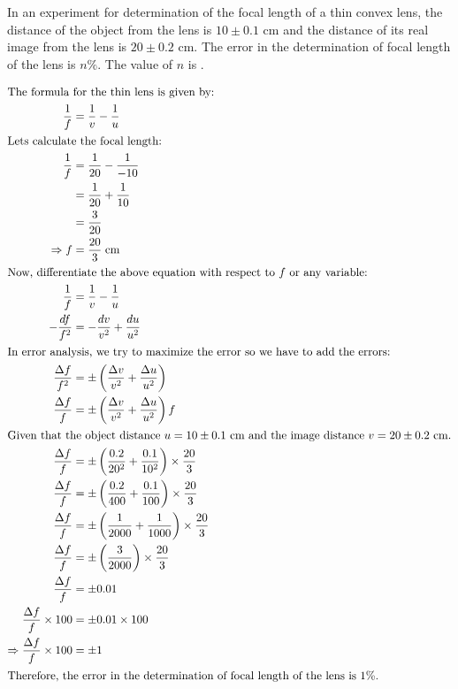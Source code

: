 \item In an experiment for determination of the focal length of a thin convex lens, the distance of the object from the lens is \(10 \pm 0.1\) cm and the distance of its real image from the lens is \(20 \pm 0.2\) cm. The error in the determination of focal length of the lens is \(n \%\). The value of \(n\) is \underline{\hspace{3cm}}. 

\begin{solution}
    \begin{align*}
        \intertext{The formula for the thin lens is given by:}
        \dfrac{1}{f} &= \dfrac{1}{v} - \dfrac{1}{u}\\
        \intertext{Lets calculate the focal length:}
        \dfrac{1}{f} &= \dfrac{1}{20} - \dfrac{1}{-10}\\
        &= \dfrac{1}{20} + \dfrac{1}{10}\\
        &= \dfrac{3}{20}\\
        \Rightarrow f &= \dfrac{20}{3} \; \text{cm}\\
        \intertext{Now, differentiate the above equation with respect to $f$ or any variable:}
        \dfrac{1}{f} &= \dfrac{1}{v} - \dfrac{1}{u}\\
        -\dfrac{df}{f^2} &= -\dfrac{dv}{v^2} + \dfrac{du}{u^2}\\
        \intertext{In error analysis, we try to maximize the error so we have to add the errors:}
        \frac{\Delta f}{f^2} &= \pm \left(\frac{\Delta v}{v^2} + \frac{\Delta u}{u^2}\right)\\
        \frac{\Delta f}{f} &= \pm \left(\frac{\Delta v}{v^2} + \frac{\Delta u}{u^2}\right)f\\
        \intertext{Given that the object distance \(u = 10 \pm 0.1\) cm and the image distance \(v = 20 \pm 0.2\) cm.}
        \frac{\Delta f}{f} &= \pm \left(\frac{0.2}{20^2} + \frac{0.1}{10^2}\right) \times \frac{20}{3}\\
        \frac{\Delta f}{f} &= \pm \left(\frac{0.2}{400} + \frac{0.1}{100}\right) \times \frac{20}{3}\\
        \frac{\Delta f}{f} &= \pm \left(\frac{1}{2000} + \frac{1}{1000}\right) \times \frac{20}{3}\\
        \frac{\Delta f}{f} &= \pm \left(\frac{3}{2000}\right) \times \frac{20}{3}\\
        \frac{\Delta f}{f} &= \pm 0.01\\
        \frac{\Delta f}{f}\times 100 &= \pm 0.01 \times 100\\
        \Rightarrow \frac{\Delta f}{f}\times 100 &= \pm 1\\
        \intertext{Therefore, the error in the determination of focal length of the lens is 1\%.}
    \end{align*}
\end{solution}